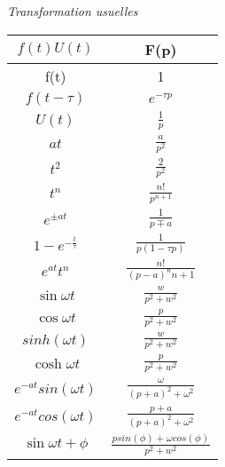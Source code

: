\documentclass{article}
\begin{document}
\begin{center}
    \textit{Transformation usuelles}\\
    \begin{tabular}{|c|c|}
    \hline
    $f(t)U(t)$ & F(p) \\
    \hline
    f(t)&1\\
    \hline
    $f(t-\tau)$ & $e^{-\tau p}$\\
    \hline
    $ U(t) $ & $\frac{1}{p}$ \\
    \hline
    $at $ & $\frac{a}{p^2}$ \\
    \hline
    $t^2$ & $ \frac{2}{p^2} $ \\
    \hline
    $ t^n $ & $ \frac{n!}{p^{n+1}} $ \\
    \hline
    $e^{\pm at}$ & $\frac{1}{p\mp a}$ \\
    \hline
    $ 1- e^{-\frac{t}{\tau}} $ & $ \frac{1}{p(1-\tau p)} $ \\
    \hline
    $e^{at}t^{n}$ & $ \frac{n!}{(p-a)^n{n+1}} $\\
    \hline
     $\sin{\omega t}$ & $ \frac{w}{p^2+w^2} $ \\
    \hline
    $\cos{\omega t}$ & $\frac{p}{p^2+w^2}$ \\
    \hline
    $sinh(\omega t)$ & $ \frac{w}{p^2+w^2}$ \\
    \hline
    $\cosh{\omega t}$ & $\frac{p}{p^2+w^2}$ \\
    \hline
     $ e^{-at}sin(\omega t) $ & $ \frac{\omega}{(p+a)^2+\omega^2} $ \\
    \hline
     $ e^{-at}cos(\omega t) $ & $ \frac{p+a}{(p+a)^2+\omega^2} $ \\
    \hline
    $\sin{\omega t + \phi}$ & $\frac{psin(\phi) + \omega cos(\phi)}{p^2+w^2}$ \\
    \hline
    \end{tabular}
\end{center}
\thispagestyle{empty}
\newpage
\end{document}
